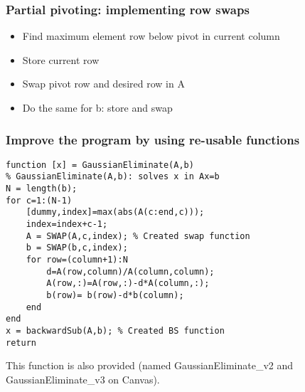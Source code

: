 \documentclass[11pt,table,final,xcolor={usenames,dvipsnames,table}]{beamer}
\begin{document}
\begin{frame}[fragile]
  \frametitle{Partial pivoting: implementing row swaps}
  \begin{itemize}
    \item<1->  Find maximum element row below pivot in current column
    \item<2->  Store current row
    \item<3-> Swap pivot row and desired row in A
    \item<4-> Do the same for b: store and swap
  \end{itemize}

\end{frame}

\begin{frame}[fragile]
  \frametitle{Improve the program by using re-usable functions}
  \begin{lstlisting}
function [x] = GaussianEliminate(A,b)
% GaussianEliminate(A,b): solves x in Ax=b
N = length(b);
for c=1:(N-1)
    [dummy,index]=max(abs(A(c:end,c)));
    index=index+c-1;
    A = SWAP(A,c,index); % Created swap function
    b = SWAP(b,c,index);
    for row=(column+1):N
        d=A(row,column)/A(column,column);
        A(row,:)=A(row,:)-d*A(column,:);
        b(row)= b(row)-d*b(column);
    end
end
x = backwardSub(A,b); % Created BS function
return
  \end{lstlisting}
  This function is also provided (named GaussianEliminate\_v2 and GaussianEliminate\_v3 on Canvas).
\end{frame}
\end{document}
